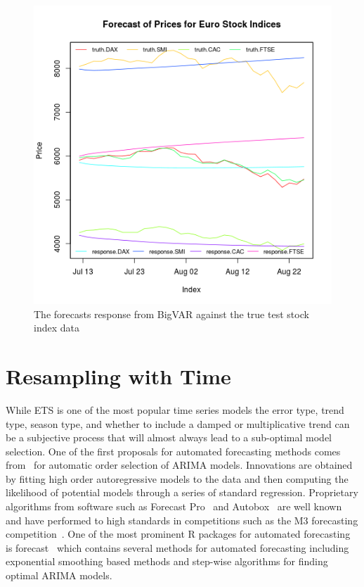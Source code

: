 \documentclass[12pt]{article}%
\theoremstyle{definition}
\let\proglang=\textsf
\newcommand{\pkg}[1]{{\fontseries{b}\selectfont #1}}
\begin{document}
\begin{figure}[H]
\includegraphics[width=.8\linewidth]{paper_figures/plot_bigvar_train.png}
\centering
\caption{The forecasts response from BigVAR against the true test stock index data}
\label{fig:bigvar_train}
\end{figure}
\doublespacing

\section{Resampling with Time}
\label{sec:resamp}


While ETS is one of the most popular time series models the error type, trend type, season type, and whether to include a damped or multiplicative trend can be a subjective process that will almost always lead to a sub-optimal model selection. One of the first proposals for automated forecasting methods comes from~\cite{hannanOrder} for automatic order selection of ARIMA models. Innovations are obtained by fitting high order autoregressive models to the data and then computing the likelihood of potential models through a series of standard regression. Proprietary algorithms from software such as \proglang{Forecast Pro}~\cite{forecastpro} and \proglang{Autobox}~\cite{reillyautobox} are well known and have performed to high standards in competitions such as the M3 forecasting competition~\cite{Makridakis2000451}. One of the most prominent R packages for automated forecasting is \pkg{forecast}~\cite{HyndForecast} which contains several methods for automated forecasting including exponential smoothing based methods and step-wise algorithms for finding optimal ARIMA models.
\end{document}
